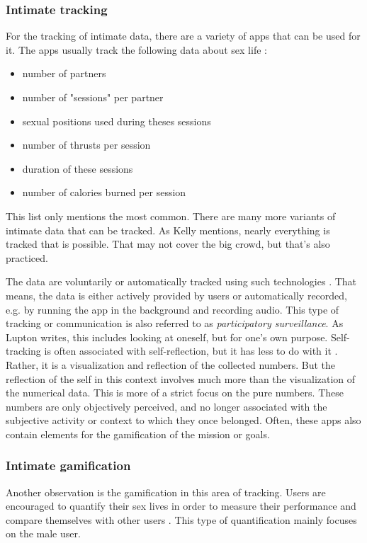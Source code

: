 \subsubsection{Intimate tracking}
For the tracking of intimate data, there are a variety of apps that can be used for it.
The apps usually track the following data about sex life \cite{doi:10.1080/15265161.2017.1409823}: 
\begin{itemize}
	\item number of partners
	\item number of "sessions" per partner
	\item sexual positions used during theses sessions
	\item number of thrusts per session
	\item duration of these sessions
	\item number of calories burned per session 
\end{itemize}
This list only mentions the most common. There are many more variants of intimate data that can be tracked. As Kelly \cite{kelly2017inevitable} mentions, nearly everything is tracked that is possible. That may not cover the big crowd, but that's also practiced.

The data are voluntarily or automatically tracked using such technologies \cite{doi:10.1080/15265161.2017.1409823}. That means, the data is either actively provided by users or automatically recorded, e.g. by running the app in the background and recording audio.
This type of tracking or communication is also referred to as \textit{participatory surveillance}. As Lupton \cite{doi:10.1080/13691058.2014.920528} writes, this includes looking at oneself, but for one's own purpose. Self-tracking is often associated with self-reflection, but it has less to do with it \cite{lupton2016quantified}. Rather, it is a visualization and reflection of the collected numbers. But the reflection of the self in this context involves much more than the visualization of the numerical data. This is more of a strict focus on the pure numbers. These numbers are only objectively perceived, and no longer associated with the subjective activity or context to which they once belonged.
Often, these apps also contain elements for the gamification of the mission or goals.

\subsubsection{Intimate gamification}
Another observation is the gamification in this area of tracking. Users are encouraged to quantify their sex lives in order to measure their performance and compare themselves with other users \cite{doi:10.1080/13691058.2014.920528}. This type of quantification mainly focuses on the male user.

